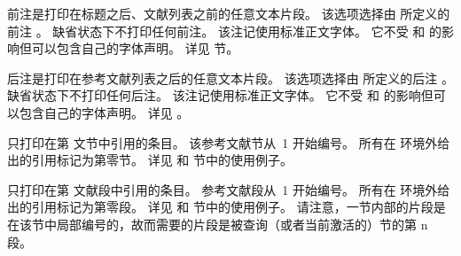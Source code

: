 \begin{optionlist*}
前注是打印在标题之后、文献列表之前的任意文本片段。
该选项选择由  所定义的前注 。
缺省状态下不打印任何前注。
该注记使用标准正文字体。
它不受  和  的影响但可以包含自己的字体声明。
详见  节。



后注是打印在参考文献列表之后的任意文本片段。
该选项选择由  所定义的后注 。
缺省状态下不打印任何后注。
该注记使用标准正文字体。
它不受  和  的影响但可以包含自己的字体声明。
详见 。



只打印在第  文节中引用的条目。
该参考文献节从~1 开始编号。
所有在  环境外给出的引用标记为第零节。
详见  和  节中的使用例子。



只打印在第  文献段中引用的条目。
参考文献段从~1 开始编号。
所有在  环境外给出的引用标记为第零段。
详见  和  节中的使用例子。
请注意，一节内部的片段是在该节中局部编号的，故而需要的片段是被查询（或者当前激活的）节的第 n 段。


\end{optionlist*}
